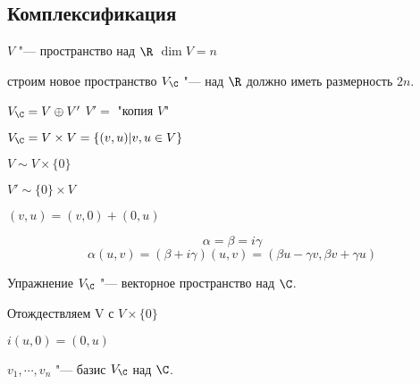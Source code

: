 \subsection{Комплексификация} 

$V$ "--- пространство над $\R$  $\dim V = n$

строим новое пространство $V_{\C}$ "--- над  $\R$ должно иметь размерность $2n$.

$V_{\C} = V \oplus V'$ 
$V' = $ "копия $V$"

$V_{\C} = V \times V = \{(v, u)| v, u \in V\}$

$V \sim V \times \{0\}$

$V' \sim \{0\} \times V$ 

$(v, u) = (v, 0) + (0, u)$

$$\alpha = \beta = i \gamma$$
$$\alpha(u, v) = (\beta + i \gamma)(u, v) = (\beta u - \gamma v, \beta v + \gamma u)$$

Упражнение $V_{\C}$ "--- векторное пространство над $\C$.

Отождествляем V с $V \times \{0\}$

$i(u, 0) = (0, u)$

$v_1, \cdots, v_n$ "--- базис $V_{\C}$ над $\C$.